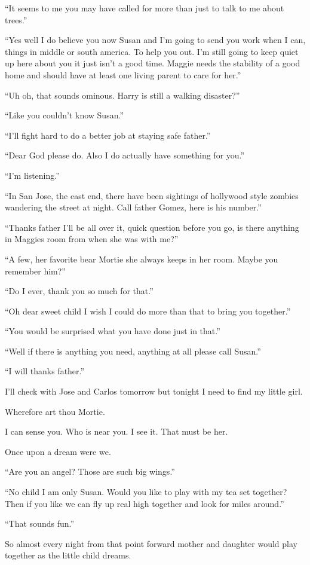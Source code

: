 ``It seems to me you may have called for more than just to talk to me about trees.''

``Yes well I do believe you now Susan and I'm going to send you work when I can, things in middle or south america. To help you out. I'm still going to keep quiet up here about you it just isn't a good time. Maggie needs the stability of a good home and should have at least one living parent to care for her.''

``Uh oh, that sounds ominous. Harry is still a walking disaster?''

``Like you couldn't know Susan.''

``I'll fight hard to do a better job at staying safe father.''

``Dear God please do. Also I do actually have something for you.''

``I'm listening.''

``In San Jose, the east end, there have been sightings of hollywood style zombies wandering the street at night. Call father Gomez, here is his number.''

``Thanks father I'll be all over it, quick question before you go, is there anything in Maggies room from when she was with me?''

``A few, her favorite bear Mortie she always keeps in her room. Maybe you remember him?''

``Do I ever, thank you so much for that.''

``Oh dear sweet child I wish I could do more than that to bring you together.''

``You would be surprised what you have done just in that.''

``Well if there is anything you need, anything at all please call Susan.''

``I will thanks father.''

I'll check with Jose and Carlos tomorrow but tonight I need to find my little girl.

Wherefore art thou Mortie.

I can sense you. Who is near you. I see it. That must be her.

Once upon a dream were we.

``Are you an angel? Those are such big wings.''

``No child I am only Susan. Would you like to play with my tea set together? Then if you like we can fly up real high together and look for miles around.''

``That sounds fun.''

So almost every night from that point forward mother and daughter would play together as the little child dreams.















